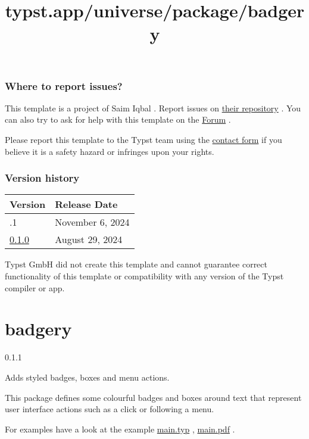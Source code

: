 \subsubsection{Where to report issues?}\label{where-to-report-issues}

This template is a project of Saim Iqbal . Report issues on
\href{https://github.com/saimnaveediqbal/thesis-NTNU-typst}{their
repository} . You can also try to ask for help with this template on the
\href{https://forum.typst.app}{Forum} .

Please report this template to the Typst team using the
\href{https://typst.app/contact}{contact form} if you believe it is a
safety hazard or infringes upon your rights.

\label{versions}
\subsubsection{Version history}\label{version-history}

\begin{longtable}[]{@{}ll@{}}
\toprule\noalign{}
Version & Release Date \\
\midrule\noalign{}
\endhead
\bottomrule\noalign{}
\endlastfoot
0.1.1 & November 6, 2024 \\
\href{https://typst.app/universe/package/nifty-ntnu-thesis/0.1.0/}{0.1.0}
& August 29, 2024 \\
\end{longtable}

Typst GmbH did not create this template and cannot guarantee correct
functionality of this template or compatibility with any version of the
Typst compiler or app.


\title{typst.app/universe/package/badgery}

\label{banner}
\section{badgery}\label{badgery}

{ 0.1.1 }

Adds styled badges, boxes and menu actions.

\label{readme}
This package defines some colourful badges and boxes around text that
represent user interface actions such as a click or following a menu.

For examples have a look at the example
\href{https://github.com/typst/packages/raw/main/packages/preview/badgery/0.1.1/example/main.typ}{main.typ}
,
\href{https://github.com/typst/packages/raw/main/packages/preview/badgery/0.1.1/exmaple/main.pdf}{main.pdf}
.

